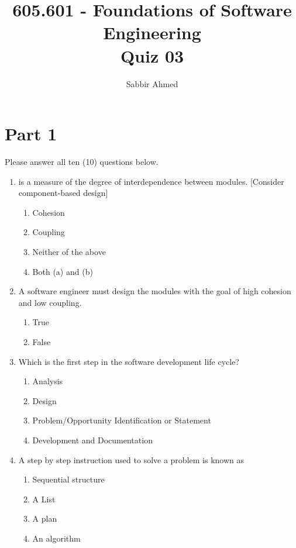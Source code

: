\documentclass[12pt]{article}
\newcommand{\answeritem}{\global\answertrue\item}
\newcommand{\perhapsanswer}{%
  \ifanswer
    $\blacksquare$ \global\answerfalse
  \else
    $\square$ \global\answerfalse
  \fi
}
\newif\ifanswer
\begin{document}
  \title{605.601 - Foundations of Software Engineering \\ Quiz 03\vspace{-0.5em}}
  \author{Sabbir Ahmed}
  \maketitle
  \vspace{-1em}

  \section*{Part 1} Please answer all ten (10) questions below.

  \begin{enumerate}

    \item \underline{\phantom{Neither of the above}} is a measure of the degree of interdependence between modules. [Consider component-based design]
    \begin{enumerate}[start=1,align=left,label={\protect\perhapsanswer(\alph*)}]
      \item Cohesion
      \answeritem Coupling
      \item Neither of the above
      \item Both (a) and (b)
    \end{enumerate}

    \item A software engineer must design the modules with the goal of high cohesion and low coupling.
    \begin{enumerate}[start=1,align=left,label={\protect\perhapsanswer(\alph*)}]
      \answeritem True
      \item False
    \end{enumerate}

    \item Which is the first step in the software development life cycle?
    \begin{enumerate}[start=1,align=left,label={\protect\perhapsanswer(\alph*)}]
      \item Analysis
      \item Design
      \answeritem Problem/Opportunity Identification or Statement
      \item Development and Documentation
    \end{enumerate}

    \item A step by step instruction used to solve a problem is known as
    \begin{enumerate}[start=1,align=left,label={\protect\perhapsanswer(\alph*)}]
      \item Sequential structure
      \item A List
      \item A plan
      \answeritem An algorithm
    \end{enumerate}


\end{enumerate}
\end{document}
